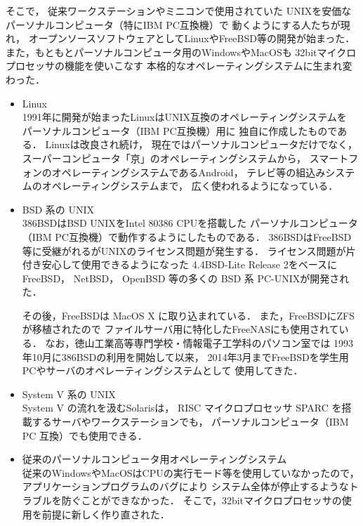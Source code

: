 \begin{enumerate}
    そこで，
    従来ワークステーションやミニコンで使用されていた
    UNIXを安価なパーソナルコンピュータ（特にIBM PC互換機）で
    動くようにする人たちが現れ，
    オープンソースソフトウェアとしてLinuxやFreeBSD等の開発が始まった．
    また，もともとパーソナルコンピュータ用のWindowsやMacOSも
    32bitマイクロプロセッサの機能を使いこなす
    本格的なオペレーティングシステムに生まれ変わった．

    \begin{itemize}
    \item Linux \\
      1991年に開発が始まったLinuxはUNIX互換のオペレーティングシステムを
      パーソナルコンピュータ（IBM PC互換機）用に
      独自に作成したものである\cite{linux}．
      Linuxは改良され続け，
      現在ではパーソナルコンピュータだけでなく，
      スーパーコンピュータ「京」のオペレーティングシステム\cite{kei}から，
      スマートフォンのオペレーティングシステムであるAndroid\cite{android}，
      テレビ等の組込みシステムのオペレーティングシステムまで，
      広く使われるようになっている．

    \item BSD 系の UNIX \\
      386BSD\cite{386bsd}はBSD UNIXをIntel 80386 CPUを搭載した
      パーソナルコンピュータ（IBM PC互換機）で動作するようにしたものである．
      386BSDはFreeBSD等に受継がれるがUNIXのライセンス問題が発生する\cite{unix}．
      ライセンス問題が片付き安心して使用できるようになった
      4.4BSD-Lite Release 2\cite{unix}をベースに
      FreeBSD， NetBSD， OpenBSD 等の多くの BSD 系 PC-UNIXが開発された．

      その後，FreeBSDは MacOS X に取り込まれている．
      また，FreeBSDにZFSが移植された\cite{zfs}ので
      ファイルサーバ用に特化したFreeNAS\cite{freenas}にも使用されている．
      なお，徳山工業高等専門学校・情報電子工学科のパソコン室では
      1993年10月に386BSDの利用を開始して以来，
      2014年3月までFreeBSDを学生用PCやサーバのオペレーティングシステムとして
      使用してきた\cite{iebsd}．

    \item System V 系の UNIX \\
      System V の流れを汲むSolaris\cite{solaris}は，
      RISC マイクロプロセッサ SPARC を搭載するサーバやワークステーションでも，
      パーソナルコンピュータ（IBM PC 互換）でも使用できる．

    \item 従来のパーソナルコンピュータ用オペレーティングシステム \\
      従来のWindowsやMacOSはCPUの実行モード等を使用していなかったので，
      アプリケーションプログラムのバグにより
      システム全体が停止するようなトラブルを防ぐことができなかった．
      そこで，32bitマイクロプロセッサの使用を前提に新しく作り直された．


\end{itemize}
\end{enumerate}
